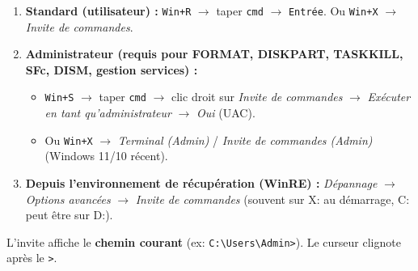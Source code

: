 \documentclass[11pt]{article}
\begin{document}
\begin{methode}
\begin{enumerate}
  \item \textbf{Standard (utilisateur) :} \texttt{Win+R} $\rightarrow$ taper \texttt{cmd} $\rightarrow$ \texttt{Entrée}. Ou \texttt{Win+X} $\rightarrow$ \emph{Invite de commandes}.
  \item \textbf{Administrateur (requis pour FORMAT, DISKPART, TASKKILL, SFc, DISM, gestion services) :}
        \begin{itemize}
          \item \texttt{Win+S} $\rightarrow$ taper \texttt{cmd} $\rightarrow$ clic droit sur \emph{Invite de commandes} $\rightarrow$ \emph{Exécuter en tant qu'administrateur} $\rightarrow$ \emph{Oui} (UAC).
          \item Ou \texttt{Win+X} $\rightarrow$ \emph{Terminal (Admin)} / \emph{Invite de commandes (Admin)} (Windows 11/10 récent).
        \end{itemize}
  \item \textbf{Depuis l'environnement de récupération (WinRE) :} \emph{Dépannage} $\rightarrow$ \emph{Options avancées} $\rightarrow$ \emph{Invite de commandes} (souvent sur X: au démarrage, C: peut être sur D:).
\end{enumerate}
L'invite affiche le \textbf{chemin courant} (ex: \texttt{C:\textbackslash Users\textbackslash Admin>}). Le curseur clignote après le \texttt{>}.
\end{methode}
\end{document}
